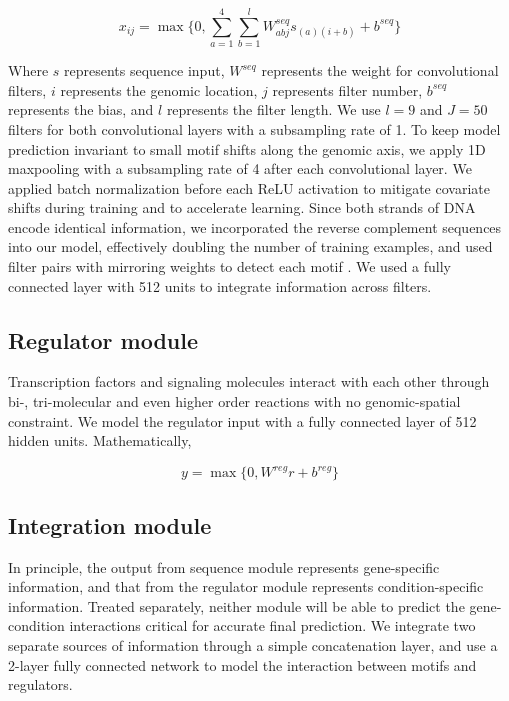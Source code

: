 \documentclass{article}
\begin{document}
\begin{equation} \label{eq1}
x_{ij}=\max \{ 0, \sum_{a=1}^{4} \sum_{b=1}^{l} W_{abj}^{seq} s_{(a)(i+b)} + b^{seq}\}
\end{equation} 

Where $s$ represents sequence input, $W^{seq}$ represents the weight for convolutional filters, $i$ represents the genomic location, $j$ represents filter number, $b^{seq}$ represents the bias, and $l$ represents the filter length. We use $l=9$ and $J=50$ filters for both convolutional layers with a subsampling rate of 1. To keep model prediction invariant to small motif shifts along the genomic axis, we apply 1D maxpooling with a subsampling rate of 4 after each convolutional layer. We applied batch normalization before each ReLU activation to mitigate covariate shifts during training and to accelerate learning. Since both strands of DNA encode identical information, we incorporated the reverse complement sequences into our model, effectively doubling the number of training examples, and used filter pairs with mirroring weights to detect each motif \cite{Anonymous:_KTX_iBy}. We used a fully connected layer with 512 units to integrate information across filters. 


\subsection{Regulator module}
Transcription factors and signaling molecules interact with each other through bi-, tri-molecular and even higher order reactions with no genomic-spatial constraint. We model the regulator input with a fully connected layer of 512 hidden units. Mathematically, 

\begin{equation} \label{eq2}
y=\max \{0, W^{reg}r + b^{reg}\}
\end{equation}

\subsection{Integration module}
In principle, the output from sequence module represents gene-specific information, and that from the regulator module represents condition-specific information. Treated separately, neither module will be able to predict the gene-condition interactions critical for accurate final prediction. We integrate two separate sources of information through a simple concatenation layer, and use a 2-layer fully connected network to model the interaction between motifs and regulators. 
\end{document}
